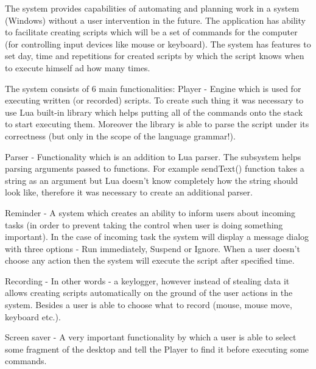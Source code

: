 The system provides capabilities of automating and planning work in a system (Windows) without a user intervention in the future. The application has ability to facilitate creating scripts which will be a set of commands for the computer (for controlling input devices like mouse or keyboard). The system has features to set day, time and repetitions for created scripts by which the script knows when to execute himself ad how many times.

The system consists of 6 main functionalities\-: Player -\/ Engine which is used for executing written (or recorded) scripts. To create such thing it was necessary to use Lua built-\/in library which helps putting all of the commands onto the stack to start executing them. Moreover the library is able to parse the script under its correctness (but only in the scope of the language grammar!).

Parser -\/ Functionality which is an addition to Lua parser. The subsystem helps parsing arguments passed to functions. For example send\-Text() function takes a string as an argument but Lua doesn't know completely how the string should look like, therefore it was necessary to create an additional parser.

Reminder -\/ A system which creates an ability to inform users about incoming tasks (in order to prevent taking the control when user is doing something important). In the case of incoming task the system will display a message dialog with three options -\/ Run immediately, Suspend or Ignore. When a user doesn't choose any action then the system will execute the script after specified time.

Recording -\/ In other words -\/ a keylogger, however instead of stealing data it allows creating scripts automatically on the ground of the user actions in the system. Besides a user is able to choose what to record (mouse, mouse move, keyboard etc.).

Screen saver -\/ A very important functionality by which a user is able to select some fragment of the desktop and tell the Player to find it before executing some commands. 